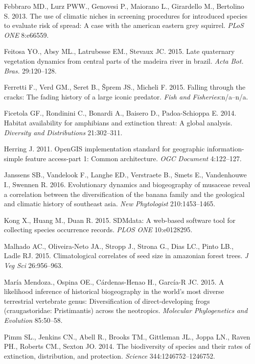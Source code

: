 \documentclass[author-year, review, 11pt]{components/elsarticle} %
\begin{document}
Febbraro MD., Lurz PWW., Genovesi P., Maiorano L., Girardello M.,
Bertolino S. 2013. The use of climatic niches in screening procedures
for introduced species to evaluate risk of spread: A case with the
american eastern grey squirrel. \emph{PLoS ONE} 8:e66559.

Feitosa YO., Absy ML., Latrubesse EM., Stevaux JC. 2015. Late quaternary
vegetation dynamics from central parts of the madeira river in brazil.
\emph{Acta Bot. Bras.} 29:120--128.

Ferretti F., Verd GM., Seret B., {Š}prem JS., Micheli F. 2015. Falling
through the cracks: The fading history of a large iconic predator.
\emph{Fish and Fisheries}:n/a--n/a.

Ficetola GF., Rondinini C., Bonardi A., Baisero D., Padoa-Schioppa E.
2014. Habitat availability for amphibians and extinction threat: A
global analysis. \emph{Diversity and Distributions} 21:302--311.

Herring J. 2011. OpenGIS implementation standard for geographic
information-simple feature access-part 1: Common architecture. \emph{OGC
Document} 4:122--127.

Janssens SB., Vandelook F., Langhe ED., Verstraete B., Smets E.,
Vandenhouwe I., Swennen R. 2016. Evolutionary dynamics and biogeography
of musaceae reveal a correlation between the diversification of the
banana family and the geological and climatic history of southeast asia.
\emph{New Phytologist} 210:1453--1465.

Kong X., Huang M., Duan R. 2015. SDMdata: A web-based software tool for
collecting species occurrence records. \emph{PLOS ONE} 10:e0128295.

Malhado AC., Oliveira-Neto JA., Stropp J., Strona G., Dias LC., Pinto
LB., Ladle RJ. 2015. Climatological correlates of seed size in amazonian
forest trees. \emph{J Veg Sci} 26:956--963.

Mar{í}a Mendoza., Ospina OE., C{á}rdenas-Henao H., Garc{í}a-R JC. 2015.
A likelihood inference of historical biogeography in the world's most
diverse terrestrial vertebrate genus: Diversification of
direct-developing frogs (craugastoridae: Pristimantis) across the
neotropics. \emph{Molecular Phylogenetics and Evolution} 85:50--58.

Pimm SL., Jenkins CN., Abell R., Brooks TM., Gittleman JL., Joppa LN.,
Raven PH., Roberts CM., Sexton JO. 2014. The biodiversity of species and
their rates of extinction, distribution, and protection. \emph{Science}
344:1246752--1246752.
\end{document}
